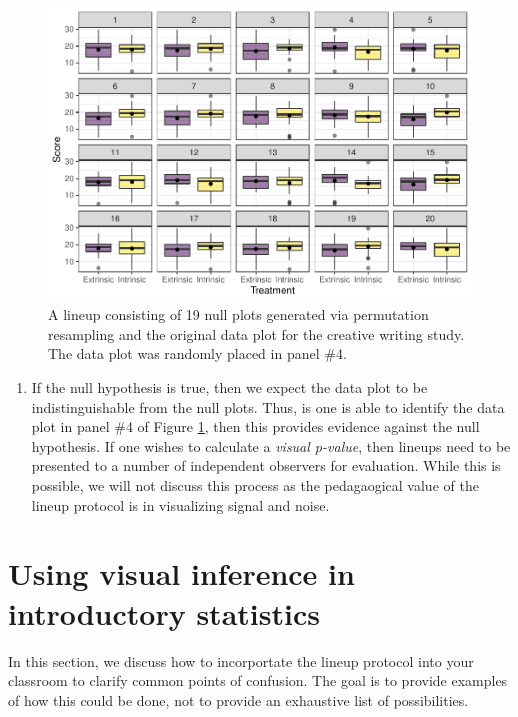 \documentclass[12pt]{article}
\providecommand{\tightlist}{%
  \setlength{\itemsep}{0pt}\setlength{\parskip}{0pt}}
\begin{document}
\begin{figure}
\centering
\includegraphics{figs/permute_lineup.pdf}
\caption{\label{fig:lineup} A lineup consisting of 19 null plots
generated via permutation resampling and the original data plot for the
creative writing study. The data plot was randomly placed in panel \#4.}
\end{figure}

\begin{enumerate}
\def\labelenumi{\arabic{enumi}.}
\setcounter{enumi}{3}
\tightlist
\item
  If the null hypothesis is true, then we expect the data plot to be
  indistinguishable from the null plots. Thus, is one is able to
  identify the data plot in panel \#4 of Figure \ref{fig:lineup}, then
  this provides evidence against the null hypothesis. If one wishes to
  calculate a \emph{visual p-value}, then lineups need to be presented
  to a number of independent observers for evaluation. While this is
  possible, we will not discuss this process as the pedagaogical value
  of the lineup protocol is in visualizing signal and noise.
\end{enumerate}

\section{Using visual inference in introductory statistics}
\label{sec:intro}

In this section, we discuss how to incorportate the lineup protocol into
your classroom to clarify common points of confusion. The goal is to
provide examples of how this could be done, not to provide an exhaustive
list of possibilities.
\end{document}
